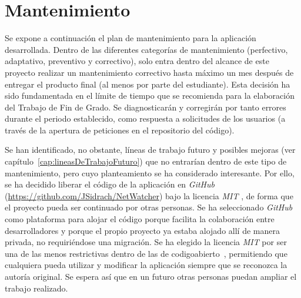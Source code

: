 \chapter{Mantenimiento\label{cap:mantenimiento}}

Se expone a continuación el plan de mantenimiento para la aplicación desarrollada.
Dentro de las diferentes categorías de mantenimiento (perfectivo, adaptativo, preventivo y correctivo), solo entra dentro del alcance de este proyecto realizar un mantenimiento correctivo hasta máximo un mes después de entregar el producto final (al menos por parte del estudiante).
Esta decisión ha sido fundamentada en el límite de tiempo que se recomienda para la elaboración del Trabajo de Fin de Grado.
Se diagnosticarán y corregirán por tanto errores durante el periodo establecido, como respuesta a solicitudes de los usuarios (a través de la apertura de peticiones en el repositorio del código).

Se han identificado, no obstante, líneas de trabajo futuro y posibles mejoras (ver capítulo~\ref{cap:lineasDeTrabajoFuturo}) que no entrarían dentro de este tipo de mantenimiento, pero cuyo planteamiento se ha considerado interesante.
Por ello, se ha decidido liberar el código de la aplicación en \textit{GitHub} (\url{https://github.com/JSidrach/NetWatcher}) bajo la licencia \textit{MIT} \cite{mit}, de forma que el proyecto pueda ser continuado por otras personas.
Se ha seleccionado \textit{GitHub} como plataforma para alojar el código porque facilita la colaboración entre desarrolladores y porque el propio proyecto ya estaba alojado allí de manera privada, no requiriéndose una migración.
Se ha elegido la licencia \textit{MIT} por ser una de las menos restrictivas dentro de las de \gls{codigoabierto}~\cite{licenses}, permitiendo que cualquiera pueda utilizar y modificar la aplicación siempre que se reconozca la autoría original.
Se espera así que en un futuro otras personas puedan ampliar el trabajo realizado.
